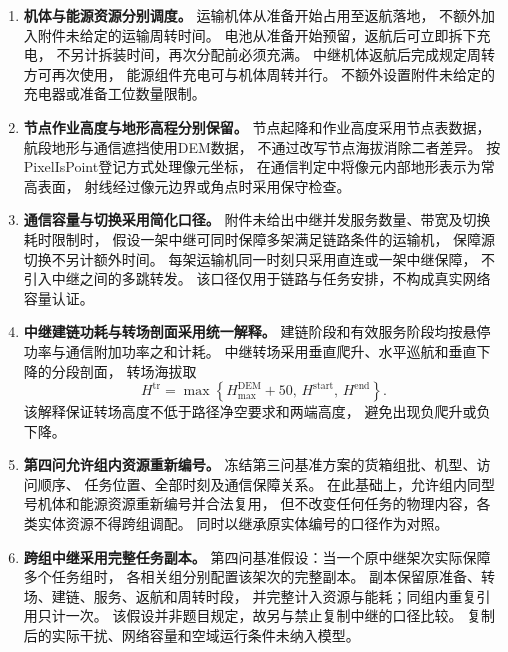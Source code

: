 \documentclass[bwprint]{gmcmthesis}
\begin{document}
\begin{enumerate}
    \item \textbf{机体与能源资源分别调度。}
    运输机体从准备开始占用至返航落地，
    不额外加入附件未给定的运输周转时间。
    电池从准备开始预留，返航后可立即拆下充电，
    不另计拆装时间，再次分配前必须充满。
    中继机体返航后完成规定周转方可再次使用，
    能源组件充电可与机体周转并行。
    不额外设置附件未给定的充电器或准备工位数量限制。

    \item \textbf{节点作业高度与地形高程分别保留。}
    节点起降和作业高度采用节点表数据，
    航段地形与通信遮挡使用DEM数据，
    不通过改写节点海拔消除二者差异。
    按PixelIsPoint登记方式处理像元坐标，
    在通信判定中将像元内部地形表示为常高表面，
    射线经过像元边界或角点时采用保守检查。

    \item \textbf{通信容量与切换采用简化口径。}
    附件未给出中继并发服务数量、带宽及切换耗时限制时，
    假设一架中继可同时保障多架满足链路条件的运输机，
    保障源切换不另计额外时间。
    每架运输机同一时刻只采用直连或一架中继保障，
    不引入中继之间的多跳转发。
    该口径仅用于链路与任务安排，不构成真实网络容量认证。

    \item \textbf{中继建链功耗与转场剖面采用统一解释。}
    建链阶段和有效服务阶段均按悬停功率与通信附加功率之和计耗。
    中继转场采用垂直爬升、水平巡航和垂直下降的分段剖面，
    转场海拔取
    \begin{equation}
        H^{\mathrm{tr}}
        =
        \max\left\{
        H^{\mathrm{DEM}}_{\max}+50,\,
        H^{\mathrm{start}},\,
        H^{\mathrm{end}}
        \right\}.
    \end{equation}
    该解释保证转场高度不低于路径净空要求和两端高度，
    避免出现负爬升或负下降。

    \item \textbf{第四问允许组内资源重新编号。}
    冻结第三问基准方案的货箱组批、机型、访问顺序、
    任务位置、全部时刻及通信保障关系。
    在此基础上，允许组内同型号机体和能源资源重新编号并合法复用，
    但不改变任何任务的物理内容，各类实体资源不得跨组调配。
    同时以继承原实体编号的口径作为对照。

    \item \textbf{跨组中继采用完整任务副本。}
    第四问基准假设：当一个原中继架次实际保障多个任务组时，
    各相关组分别配置该架次的完整副本。
    副本保留原准备、转场、建链、服务、返航和周转时段，
    并完整计入资源与能耗；同组内重复引用只计一次。
    该假设并非题目规定，故另与禁止复制中继的口径比较。
    复制后的实际干扰、网络容量和空域运行条件未纳入模型。

\end{enumerate}
\end{document}
